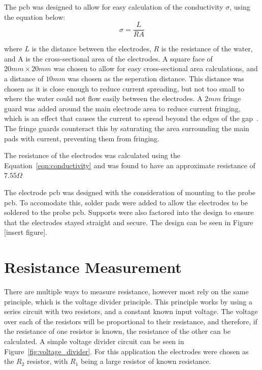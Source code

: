 The \gls{pcb} was designed to allow for easy calculation of the conductivity $\sigma$, using the equation below:
\begin{equation}\label{eqn:conductivity}
    \sigma = \frac{L}{RA}
\end{equation}

where $L$ is the distance between the electrodes, $R$ is the resistance of the water, and A is the cross-sectional area of the electrodes.
A square face of $20mm\times 20mm$ was chosen to allow for easy cross-sectional area calculations, and a distance of $10mm$ was chosen as the seperation distance.
This distance was chosen as it is close enough to reduce current spreading, but not too small to where the water could not flow easily between the electrodes.
A $2mm$ fringe guard was added around the main electrode area to reduce current fringing, which is an effect that causes the current to spread beyond the edges of the gap~\cite{roshen_fringing}.
The fringe guards counteract this by saturating the area surrounding the main pads with current, preventing them from fringing.

The resistance of the electrodes was calculated using the Equation~\ref{eqn:conductivity} and was found to have an approximate resistance of $7.55\Omega$

The electrode \gls{pcb} was designed with the consideration of mounting to the probe \gls{pcb}.
To accomodate this, solder pads were added to allow the electrodes to be soldered to the probe \gls{pcb}.
Supports were also factored into the design to ensure that the electrodes stayed straight and secure.
The design can be seen in Figure [insert figure].

\section{Resistance Measurement}\label{sec:res_mes}
There are multiple ways to measure resistance, however most rely on the same principle, which is the voltage divider principle.
This principle works by using a series circuit with two resistors, and a constant known input voltage.
The voltage over each of the resistors will be proportional to their resistance, and therefore, if the resistance of one resistor is known, the resistance of the other can be calculated.
A simple voltage divider circuit can be seen in Figure~\ref{fig:voltage_divider}.
For this application the electrodes were chosen as the $R_2$ resistor, with $R_1$ being a large resistor of known resistance.

